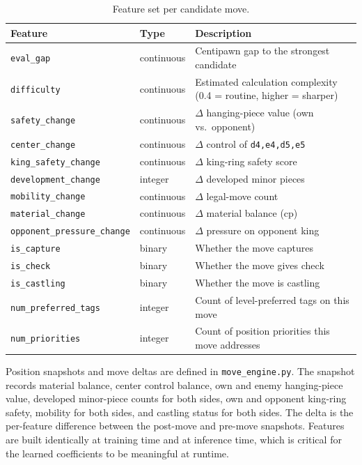 \documentclass[11pt]{article}
\begin{document}
\begin{table}[h]
\centering
\caption{Feature set per candidate move.}
\label{tab:features}
\small
\begin{tabular}{@{}lll@{}}
\toprule
Feature & Type & Description \\
\midrule
\texttt{eval\_gap} & continuous & Centipawn gap to the strongest candidate \\
\texttt{difficulty} & continuous & Estimated calculation complexity (0.4 = routine, higher = sharper) \\
\texttt{safety\_change} & continuous & $\Delta$ hanging-piece value (own vs.\ opponent) \\
\texttt{center\_change} & continuous & $\Delta$ control of \texttt{d4,e4,d5,e5} \\
\texttt{king\_safety\_change} & continuous & $\Delta$ king-ring safety score \\
\texttt{development\_change} & integer & $\Delta$ developed minor pieces \\
\texttt{mobility\_change} & continuous & $\Delta$ legal-move count \\
\texttt{material\_change} & continuous & $\Delta$ material balance (cp) \\
\texttt{opponent\_pressure\_change} & continuous & $\Delta$ pressure on opponent king \\
\texttt{is\_capture} & binary & Whether the move captures \\
\texttt{is\_check} & binary & Whether the move gives check \\
\texttt{is\_castling} & binary & Whether the move is castling \\
\texttt{num\_preferred\_tags} & integer & Count of level-preferred tags on this move \\
\texttt{num\_priorities} & integer & Count of position priorities this move addresses \\
\bottomrule
\end{tabular}
\end{table}

Position snapshots and move deltas are defined in \texttt{move\_engine.py}. The snapshot records material balance, center control balance, own and enemy hanging-piece value, developed minor-piece counts for both sides, own and opponent king-ring safety, mobility for both sides, and castling status for both sides. The delta is the per-feature difference between the post-move and pre-move snapshots. Features are built identically at training time and at inference time, which is critical for the learned coefficients to be meaningful at runtime.
\end{document}
